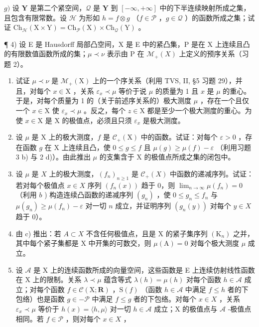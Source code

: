 \(g)\) 设 \(\mathbf{Y}\) 是第二个紧空间，\(\mathcal{Q}\) 是 \(\mathbf{Y}\) 到 \([-\infty, +\infty]\) 中的下半连续映射所成之集，且包含有限常数。设 \(\mathcal{H}\) 为形如 \(h = f \otimes g\) （\(f \in \mathcal{P}\) ，\(g \in \mathcal{Q}\) ）的函数所成之集；试证 \(\mathrm{Ch}_{\mathcal{H}}(\mathrm{X} \times \mathrm{Y}) = \mathrm{Ch}_{\mathcal{P}}(\mathrm{X}) \times \mathrm{Ch}_{\mathcal{Q}}(\mathrm{Y})\) 。

¶ 4) 设 E 是 Hausdorff 局部凸空间，X 是 E 中的紧凸集，P 是在 X 上连续且凸的有限数值函数所成的集；\(\mu \prec \nu\) 表示由 P 在 \(\mathcal{M}_{+}(X)\) 上定义的预序关系（习题 2）。

\begin{enumerate}
\def\labelenumi{\alph{enumi})}
\item
  试证 \(\mu \prec \nu\) 是 \(\mathcal{M}_{+}(\mathrm{X})\) 上的一个序关系（利用 TVS, II, §5 习题 29），并且，对每个 \(x \in \mathrm{X}\) ，关系 \(\varepsilon_x \prec \mu\) 等价于说 \(\mu\) 的质量为 1 且 \(x\) 是 \(\mu\) 的重心。于是，对每个质量为 1 的（关于前述序关系的）极大测度 \(\mu\) ，存在一个且仅一个 \(x \in \mathrm{X}\) 使 \(\varepsilon_x \prec \mu\) 。反之，每个 \(z \in \mathrm{X}\) 都是至少一个极大测度的重心。为使 \(x \in \mathrm{X}\) 是 \(\mathrm{X}\) 的极值点，必须且只须 \(\varepsilon_x\) 是极大测度。
\item
  设 \(\mu\) 是 \(\mathrm{X}\) 上的极大测度，\(f\) 是 \(\mathcal{C}_{+}(\mathrm{X})\) 中的函数。试证：对每个 \(\varepsilon > 0\) ，存在函数 \(g\) 在 \(\mathrm{X}\) 上连续且凸，使 \(0 \leqslant g \leqslant f\) 且 \(\mu(g) \geqslant \mu(f) - \varepsilon\) （利用习题 3 b) 与 2 d)）。由此推出 \(\mu\) 的支集含于 \(\mathrm{X}\) 的极值点所成之集的闭包中。
\item
  设 \(\mu\) 是 \(X\) 上的极大测度，\((f_n)_{n \geqslant 1}\) 是 \(\mathcal{C}_+(X)\) 中函数的递减序列。试证：若对每个极值点 \(x \in X\) 序列 \((f_n(x))\) 趋于 0，则 \(\lim_{n \to \infty} \mu(f_n) = 0\) （利用 \(b\) ) 构造连续凸函数的递减序列 \((g_n)\) ，使 \(0 \leqslant g_n \leqslant f_n\) 与 \(\mu(g_n) \geqslant \mu(f_n) - \varepsilon\) 对一切 \(n\) 成立，并证明序列 \((g_n(y))\) 对每个 \(y \in X\) 趋于 0）。
\item
  由 c) 推出：若 \(A \subset X\) 不含任何极值点，且是 X 的紧子集序列 \((\mathrm{K}_{n})\) 之并，其中每个紧子集都是 X 中开集的可数交，则 \(\mu(\mathrm{A}) = 0\) 对每个极大测度 \(\mu\) 成立。
\item
  设 \(\mathcal{A}\) 是 X 上的连续函数所成的向量空间，这些函数是 E 上连续仿射线性函数在 X 上的限制。关系 \(\lambda \prec \mu\) 蕴含等式 \(\lambda(h) = \mu(h)\) 对每个函数 \(h \in \mathcal{A}\) 成立；对每个函数 \(f \in \mathcal{C}(\mathrm{X};\mathbf{R})\) ，\(\mathrm{S}(f)\) （函数 \(h \in \mathcal{A}\) 中满足 \(f \leqslant h\) 者的下包络）也是函数 \(g \in -\mathcal{P}\) 中满足 \(f \leqslant g\) 者的下包络。对每个 \(x \in X\) ，关系 \(\varepsilon_x \prec \mu\) 等价于 \(h(x) = \langle h, \mu \rangle\) 对一切 \(h \in \mathcal{A}\) 成立；X 的极值点与 \(\mathcal{A}\) -极值点相同。若 \(f \in \mathcal{P}\) ，则对每个 \(x \in X\) ，
\end{enumerate}


